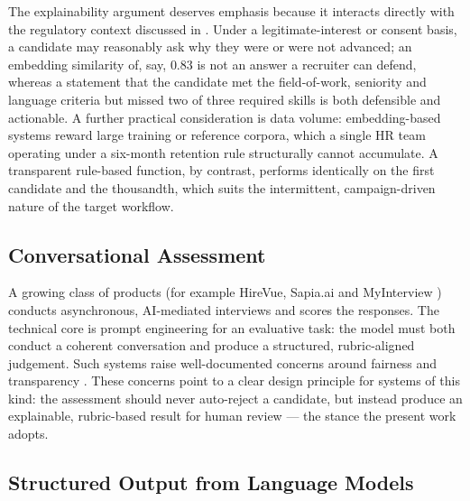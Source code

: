 The explainability argument deserves emphasis because it interacts directly
with the regulatory context discussed in . Under a
legitimate-interest or consent basis, a candidate may reasonably ask why they
were or were not advanced; an embedding similarity of, say, $0.83$ is not an
answer a recruiter can defend, whereas a statement that the candidate met the
field-of-work, seniority and language criteria but missed two of three
required skills is both defensible and actionable. A further practical
consideration is data volume: embedding-based systems reward large training
or reference corpora, which a single HR team operating under a six-month
retention rule structurally cannot accumulate. A transparent rule-based
function, by contrast, performs identically on the first candidate and the
thousandth, which suits the intermittent, campaign-driven nature of the
target workflow.

\subsection{Conversational Assessment}
\label{sec:sota-conversational}

A growing class of products (for example HireVue, Sapia.ai and
MyInterview \parencite{HireVue,Sapia,MyInterview}) conducts asynchronous, AI-mediated interviews and scores the
responses. The technical core is prompt engineering for an evaluative task:
the model must both conduct a coherent conversation and produce a structured,
rubric-aligned judgement. Such systems raise well-documented concerns around
fairness and transparency \parencite{Raghavan2020,BogenRieke2018}. These
concerns point to a clear design principle for systems of this kind: the
assessment should never auto-reject a candidate, but instead produce an
explainable, rubric-based result for human review --- the stance the present
work adopts.

\subsection{Structured Output from Language Models}
\label{sec:sota-structured}

